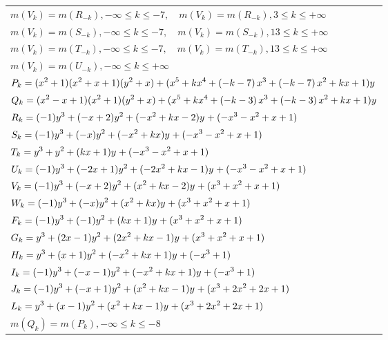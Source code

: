 \documentclass{amsart}
\begin{document}
\begin{longtable}{|l|}
\(\displaystyle m(V_k) = m(R_{-k}),-\infty \leqslant k \leqslant -7,\quad m(V_k) = m(R_{-k}),3 \leqslant k \leqslant +\infty\)\\
\(\displaystyle m(V_k) = m(S_{-k}),-\infty \leqslant k \leqslant -7,\quad m(V_k) = m(S_{-k}),13 \leqslant k \leqslant +\infty\)\\
\(\displaystyle m(V_k) = m(T_{-k}),-\infty \leqslant k \leqslant -7,\quad m(V_k) = m(T_{-k}),13 \leqslant k \leqslant +\infty\)\\
\(\displaystyle m(V_k) = m(U_{-k}),-\infty \leqslant k \leqslant +\infty\)\\
\hline
\(\displaystyle P_k=(x^2
 + 1)(x^2
 + x
 + 1)(y^2+x)+(x^5
 + k\*x^4
 + \left(-k
 - 7\right) \*x^3
 + \left(-k
 - 7\right) \*x^2
 + k\*x
 + 1)y\)\\
\(\displaystyle Q_k=(x^2
 - x
 + 1)(x^2
 + 1)(y^2+x)+(x^5
 + k\*x^4
 + \left(-k
 - 3\right) \*x^3
 + \left(-k
 - 3\right) \*x^2
 + k\*x
 + 1)y\)\\
\(\displaystyle R_k=(-1)y^{3}+(-x
 + 2)y^{2}+(-x^2
 + k\*x
 - 2)y^{}+(-x^3
 - x^2
 + x
 + 1)\)\\
\(\displaystyle S_k=(-1)y^{3}+(-x)y^{2}+(-x^2
 + k\*x)y^{}+(-x^3
 - x^2
 + x
 + 1)\)\\
\(\displaystyle T_k=y^{3}+y^{2}+(k\*x
 + 1)y^{}+(-x^3
 - x^2
 + x
 + 1)\)\\
\(\displaystyle U_k=(-1)y^{3}+(-2\*x
 + 1)y^{2}+(-2\*x^2
 + k\*x
 - 1)y^{}+(-x^3
 - x^2
 + x
 + 1)\)\\
\(\displaystyle V_k=(-1)y^{3}+(-x
 + 2)y^{2}+(x^2
 + k\*x
 - 2)y^{}+(x^3
 + x^2
 + x
 + 1)\)\\
\(\displaystyle W_k=(-1)y^{3}+(-x)y^{2}+(x^2
 + k\*x)y^{}+(x^3
 + x^2
 + x
 + 1)\)\\
\(\displaystyle F_k=(-1)y^{3}+(-1)y^{2}+(k\*x
 + 1)y^{}+(x^3
 + x^2
 + x
 + 1)\)\\
\(\displaystyle G_k=y^{3}+(2\*x
 - 1)y^{2}+(2\*x^2
 + k\*x
 - 1)y^{}+(x^3
 + x^2
 + x
 + 1)\)\\
\(\displaystyle H_k=y^{3}+(x
 + 1)y^{2}+(-x^2
 + k\*x
 + 1)y^{}+(-x^3
 + 1)\)\\
\(\displaystyle I_k=(-1)y^{3}+(-x
 - 1)y^{2}+(-x^2
 + k\*x
 + 1)y^{}+(-x^3
 + 1)\)\\
\(\displaystyle J_k=(-1)y^{3}+(-x
 + 1)y^{2}+(x^2
 + k\*x
 - 1)y^{}+(x^3
 + 2\*x^2
 + 2\*x
 + 1)\)\\
\(\displaystyle L_k=y^{3}+(x
 - 1)y^{2}+(x^2
 + k\*x
 - 1)y^{}+(x^3
 + 2\*x^2
 + 2\*x
 + 1)\)\\
\(\displaystyle m(Q_k) = m(P_{k}),-\infty \leqslant k \leqslant -8\)\\

\end{longtable}
\end{document}
